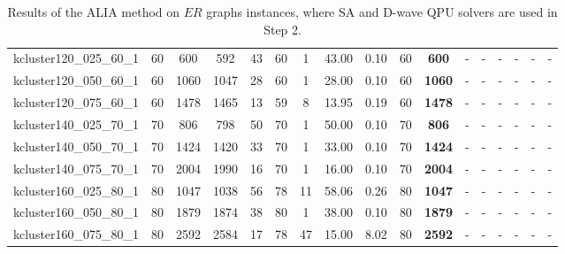 \documentclass{article}
\begin{document}
\begin{landscape}
\begin{table}[]
{\begin{tabular}{l|cccc|cccccc|cccccc}
kcluster120\_025\_60\_1 & 60 & 600 & 592 & 43 & 60 & 1 & 43.00 & 0.10 & 60 & \textbf{600} & - & - & - & - & - & - \\
kcluster120\_050\_60\_1 & 60 & 1060 & 1047 & 28 & 60 & 1 & 28.00 & 0.10 & 60 & \textbf{1060} & - & - & - & - & - & - \\
kcluster120\_075\_60\_1 & 60 & 1478 & 1465 & 13 & 59 & 8 & 13.95 & 0.19 & 60 & \textbf{1478} & - & - & - & - & - & - \\
kcluster140\_025\_70\_1 & 70 & 806 & 798 & 50 & 70 & 1 & 50.00 & 0.10 & 70 & \textbf{806} & - & - & - & - & - & - \\
kcluster140\_050\_70\_1 & 70 & 1424 & 1420 & 33 & 70 & 1 & 33.00 & 0.10 & 70 & \textbf{1424} & - & - & - & - & - & - \\
kcluster140\_075\_70\_1 & 70 & 2004 & 1990 & 16 & 70 & 1 & 16.00 & 0.10 & 70 & \textbf{2004} & - & - & - & - & - & - \\
kcluster160\_025\_80\_1 & 80 & 1047 & 1038 & 56 & 78 & 11 & 58.06 & 0.26 & 80 & \textbf{1047} & - & - & - & - & - & - \\
kcluster160\_050\_80\_1 & 80 & 1879 & 1874 & 38 & 80 & 1 & 38.00 & 0.10 & 80 & \textbf{1879} & - & - & - & - & - & - \\
kcluster160\_075\_80\_1 & 80 & 2592 & 2584 & 17 & 78 & 47 & 15.00 & 8.02 & 80 & \textbf{2592} & - & - & - & - & - & - \\
\hline
\end{tabular}
    }
    \caption{Results of the ALIA method on $ER$ graphs instances, where SA and D-wave QPU solvers are used in Step 2.}
    \label{tab: ALIA_ER_ins}
\end{table}


\end{landscape}
\end{document}
